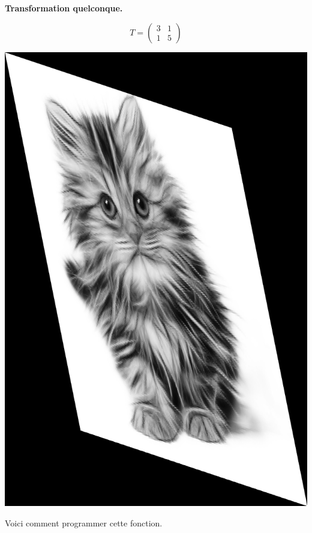 \documentclass[11pt,class=report,crop=false]{standalone}
\begin{document}
\begin{activite}
\begin{enumerate}
	\begin{center}
	\begin{minipage}{0.4\textwidth}
		\textbf{Transformation quelconque.}
		
		$$T = \begin{pmatrix}3&1\\1&5\end{pmatrix}$$	
	\end{minipage}
	\begin{minipage}{0.45\textwidth}\center
		\includegraphics[scale=\myscale,scale=0.1]{png/chat_transfo}
	\end{minipage}
	 \end{center}
 
 	Voici comment programmer cette fonction.
 	

\end{enumerate}
\end{activite}
\end{document}
